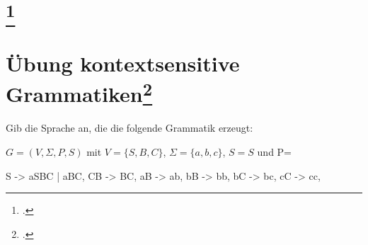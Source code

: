 \documentclass{lehramt-informatik-aufgabe}
\begin{document}
\section{
\footcite{theo:fs:3}}

\section{Übung kontextsensitive Grammatiken\footcite[Seite 8]{theo:fs:3}}

Gib die Sprache an, die die folgende Grammatik erzeugt:

$G = (V, \Sigma, P, S)$ mit
$V = \{S, B, C\}$, $\Sigma = \{a, b, c\}$,
$S=S$ und P=

\begin{liProduktionsRegeln}
S -> aSBC | aBC,
CB -> BC,
aB -> ab,
bB -> bb,
bC -> bc,
cC -> cc,
\end{liProduktionsRegeln}
\end{document}
